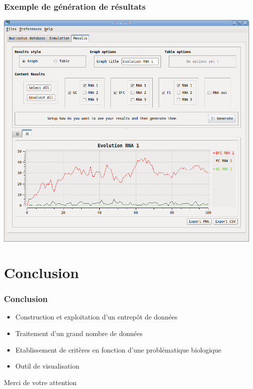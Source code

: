 \documentclass{beamer}
\begin{document}
\begin{frame}
  \frametitle{Exemple de génération de résultats}

  \begin{center}
      \includegraphics[width=0.7\columnwidth]{img/inter4.png}
    \end{center}

\end{frame}

\section*{Conclusion}

\begin{frame}
  \frametitle{Conclusion}

  \begin{block}{}
    \begin{itemize}
    \item Construction et exploitation d'un entrepôt de données
    \item Traitement d'un grand nombre de données
    \item Etablissement de critères en fonction d'une problématique
      biologique
    \item Outil de visualisation
    \end{itemize}
  \end{block}

\end{frame}

\begin{frame}
  \begin{center}Merci de votre attention\end{center}
\end{frame}
\end{document}
